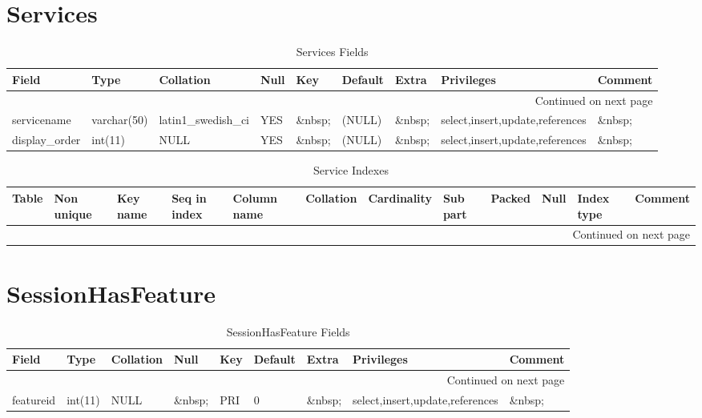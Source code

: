 \documentclass[tablesignature,landscape]{scrartcl}
\begin{document}
\section{Services}
\label{sec-25}


\begin{longtable}{|l|l|l|l|l|l|l|l|l|}
\caption{Services Fields} \label{tbl:servicesfields}\\
\hline
 Field             &  Type         &  Collation                &  Null     &  Key      &  Default  &  Extra              &  Privileges                       &  Comment \\
\hline
\endhead
\hline\multicolumn{9}{r}{Continued on next page}\
\endfoot
\endlastfoot
\hline
 serviceid         &  int(11)      &  NULL                     &  \&nbsp;  &  PRI      &  (NULL)   &  auto\_{}increment  &  select,insert,update,references  &  \&nbsp;  \\
 servicename       &  varchar(50)  &  latin1\_{}swedish\_{}ci  &  YES      &  \&nbsp;  &  (NULL)   &  \&nbsp;            &  select,insert,update,references  &  \&nbsp;  \\
 display\_{}order  &  int(11)      &  NULL                     &  YES      &  \&nbsp;  &  (NULL)   &  \&nbsp;            &  select,insert,update,references  &  \&nbsp;  \\
\hline
\end{longtable}


\begin{longtable}{|l|l|l|l|l|l|l|l|l|l|l|l|}
\caption{Service Indexes} \label{tbl:serviceindexes}\\
\hline
 Table     &  Non unique  &  Key name  &  Seq in index  &  Column name  &  Collation  &  Cardinality  &  Sub part  &  Packed  &  Null     &  Index type  &  Comment \\
\hline
\endhead
\hline\multicolumn{12}{r}{Continued on next page}\
\endfoot
\endlastfoot
\hline
 Services  &           0  &  PRIMARY   &             1  &  serviceid    &  A          &           14  &  (NULL)    &  (NULL)  &  \&nbsp;  &  BTREE       &  \&nbsp;  \\
\hline
\end{longtable}
\section{SessionHasFeature}
\label{sec-26}


\begin{longtable}{|l|l|l|l|l|l|l|l|l|}
\caption{SessionHasFeature Fields} \label{tbl:sessionhasfeaturefields}\\
\hline
 Field      &  Type     &  Collation  &  Null     &  Key  &  Default  &  Extra    &  Privileges                       &  Comment \\
\hline
\endhead
\hline\multicolumn{9}{r}{Continued on next page}\
\endfoot
\endlastfoot
\hline
 sessionid  &  int(11)  &  NULL       &  \&nbsp;  &  PRI  &        0  &  \&nbsp;  &  select,insert,update,references  &  \&nbsp;  \\
 featureid  &  int(11)  &  NULL       &  \&nbsp;  &  PRI  &        0  &  \&nbsp;  &  select,insert,update,references  &  \&nbsp;  \\
\hline
\end{longtable}
\end{document}
